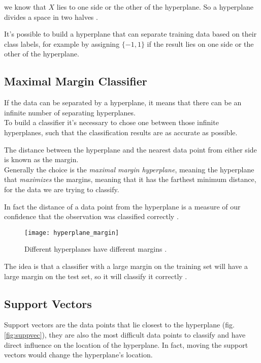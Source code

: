 we know that $X$ lies to one side or the other of the hyperplane. So a hyperplane divides a space in two halves \cite{ISLR}.

It's possible to build a hyperplane that can separate training data based on their class labels, for example by assigning $\{-1, 1\}$ if the result lies on one side or the other of the hyperplane.

\subsection{Maximal Margin Classifier}
If the data can be separated by a hyperplane, it means that there can be an infinite number of separating hyperplanes. \\
To build a classifier it's necessary to chose one between those infinite hyperplanes, such that the classification results are as accurate as possible.

The distance between the hyperplane and the nearest data point from either side is known as the margin.\\
Generally the choice is the \textit{maximal margin hyperplane}, meaning the hyperplane that \textit{maximizes} the margins, meaning that it has the farthest minimum distance, for the data we are trying to classify.

In fact the distance of a data point from the hyperplane is a measure of our confidence that the observation was classified correctly \cite{ISLR}.

\begin{figure}[H]
	\centering
	\texttt{[image: hyperplane\_margin]}
	\caption{Different hyperplanes have different margins \cite{svm_monkeylearn}.}
\end{figure}

The idea is that a classifier with a large margin on the training set will have a large margin on the test set, so it will classify it correctly \cite{ISLR}.

\subsection{Support Vectors}
Support vectors are the data points that lie closest to the hyperplane (fig. \ref{fig:suppvec}), they are also the most difficult data points to classify and have direct influence on the location of the hyperplane. In fact, moving the support vectors would change the hyperplane's location.

\clearpage

